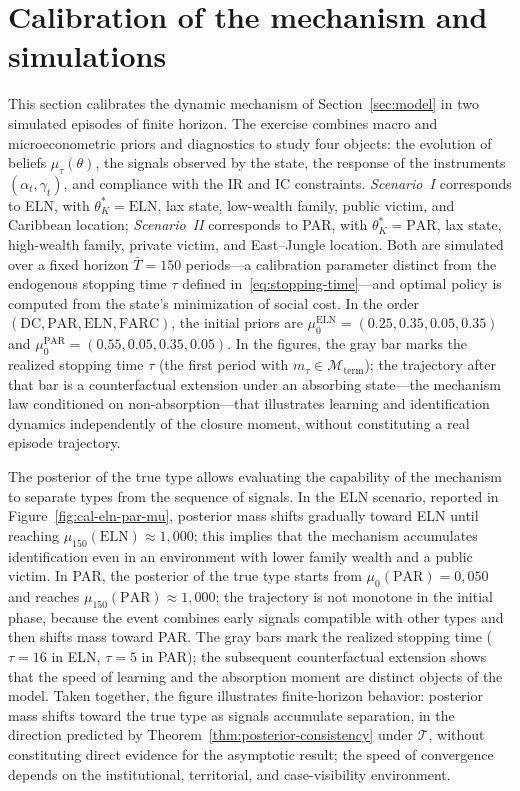 \documentclass[ecta,nameyear,draft]{econsocart}
\theoremstyle{plain}
\theoremstyle{definition}
\newcommand{\1}{\mathbf{1}}
\begin{document}
\section{Calibration of the mechanism and simulations}\label{sec:calibracion}
\vspace{-\smallskipamount}\normalfont\normalsize
This section calibrates the dynamic mechanism of Section~\ref{sec:model} in two simulated episodes of finite horizon. The exercise combines macro and microeconometric priors and diagnostics to study four objects: the evolution of beliefs $\mu_\tau(\theta)$, the signals observed by the state, the response of the instruments $(\alpha_t,\gamma_t)$, and compliance with the IR and IC constraints. \emph{Scenario~I} corresponds to ELN, with $\theta_K^\ast=\mathrm{ELN}$, lax state, low-wealth family, public victim, and Caribbean location; \emph{Scenario~II} corresponds to PAR, with $\theta_K^\ast=\mathrm{PAR}$, lax state, high-wealth family, private victim, and East--Jungle location. Both are simulated over a fixed horizon $\bar{T}=150$ periods---a calibration parameter distinct from the endogenous stopping time $\tau$ defined in~\eqref{eq:stopping-time}---and optimal policy is computed from the state's minimization of social cost. In the order $(\mathrm{DC},\mathrm{PAR},\mathrm{ELN},\mathrm{FARC})$, the initial priors are $\mu_0^{\mathrm{ELN}}=(0.25,0.35,0.05,0.35)$ and $\mu_0^{\mathrm{PAR}}=(0.55,0.05,0.35,0.05)$. In the figures, the gray bar marks the realized stopping time $\tau$ (the first period with $m_\tau\in\mathcal{M}_{\mathrm{term}}$); the trajectory after that bar is a counterfactual extension under an absorbing state---the mechanism law conditioned on non-absorption---that illustrates learning and identification dynamics independently of the closure moment, without constituting a real episode trajectory.

The posterior of the true type allows evaluating the capability of the mechanism to separate types from the sequence of signals. In the ELN scenario, reported in Figure~\ref{fig:cal-eln-par-mu}, posterior mass shifts gradually toward ELN until reaching $\mu_{150}(\mathrm{ELN})\approx 1{,}000$; this implies that the mechanism accumulates identification even in an environment with lower family wealth and a public victim. In PAR, the posterior of the true type starts from $\mu_0(\mathrm{PAR})=0{,}050$ and reaches $\mu_{150}(\mathrm{PAR})\approx 1{,}000$; the trajectory is not monotone in the initial phase, because the event combines early signals compatible with other types and then shifts mass toward PAR. The gray bars mark the realized stopping time ($\tau=16$ in ELN, $\tau=5$ in PAR); the subsequent counterfactual extension shows that the speed of learning and the absorption moment are distinct objects of the model. Taken together, the figure illustrates finite-horizon behavior: posterior mass shifts toward the true type as signals accumulate separation, in the direction predicted by Theorem~\ref{thm:posterior-consistency} under $\mathcal{T}$, without constituting direct evidence for the asymptotic result; the speed of convergence depends on the institutional, territorial, and case-visibility environment.
\end{document}
